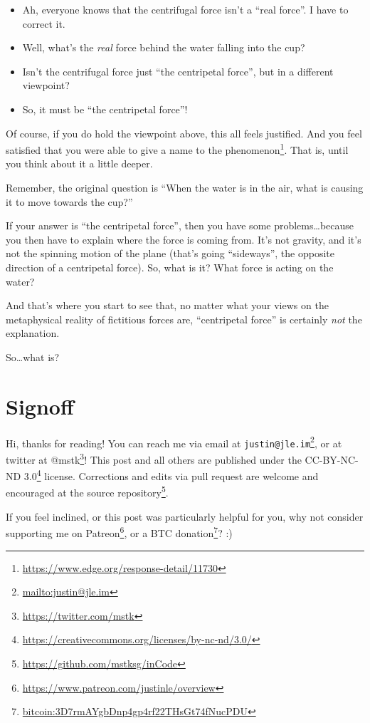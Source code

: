 \documentclass[]{article}
\renewcommand{\href}[2]{#2\footnote{\url{#1}}}
\begin{document}
\begin{itemize}
\tightlist
\item
  Ah, everyone knows that the centrifugal force isn't a ``real force''. I have
  to correct it.
\item
  Well, what's the \emph{real} force behind the water falling into the cup?
\item
  Isn't the centrifugal force just ``the centripetal force'', but in a different
  viewpoint?
\item
  So, it must be ``the centripetal force''!
\end{itemize}

Of course, if you do hold the viewpoint above, this all feels justified. And you
feel satisfied that you were able to
\href{https://www.edge.org/response-detail/11730}{give a name to the
phenomenon}. That is, until you think about it a little deeper.

Remember, the original question is ``When the water is in the air, what is
causing it to move towards the cup?''

If your answer is ``the centripetal force'', then you have some
problems\ldots{}because you then have to explain where the force is coming from.
It's not gravity, and it's not the spinning motion of the plane (that's going
``sideways'', the opposite direction of a centripetal force). So, what is it?
What force is acting on the water?

And that's where you start to see that, no matter what your views on the
metaphysical reality of fictitious forces are, ``centripetal force'' is
certainly \emph{not} the explanation.

So\ldots{}what is?

\hypertarget{signoff}{%
\section{Signoff}\label{signoff}}

Hi, thanks for reading! You can reach me via email at
\href{mailto:justin@jle.im}{\nolinkurl{justin@jle.im}}, or at twitter at
\href{https://twitter.com/mstk}{@mstk}! This post and all others are published
under the \href{https://creativecommons.org/licenses/by-nc-nd/3.0/}{CC-BY-NC-ND
3.0} license. Corrections and edits via pull request are welcome and encouraged
at \href{https://github.com/mstksg/inCode}{the source repository}.

If you feel inclined, or this post was particularly helpful for you, why not
consider \href{https://www.patreon.com/justinle/overview}{supporting me on
Patreon}, or a \href{bitcoin:3D7rmAYgbDnp4gp4rf22THsGt74fNucPDU}{BTC donation}?
:)
\end{document}
